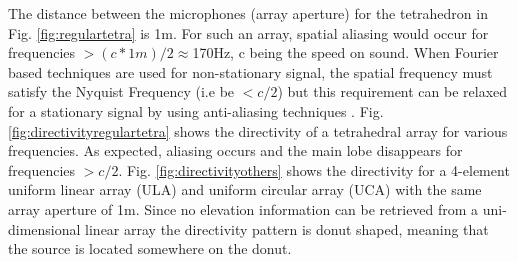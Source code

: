The distance between the microphones (array aperture) for the tetrahedron in Fig. \ref{fig:regulartetra} is 1m. For such an array, spatial aliasing would occur for frequencies $> (c*1m)/2 \approx $170Hz, c being the speed on sound.  When Fourier based techniques are used for non-stationary signal, the spatial frequency must satisfy the Nyquist Frequency (i.e be $< c/2$) but this requirement can be relaxed for a stationary signal by using anti-aliasing techniques \cite{dmochowski2009spatial}. Fig. \ref{fig:directivityregulartetra} shows the directivity of a tetrahedral array for various frequencies. As expected, aliasing occurs and the main lobe disappears for frequencies $> c/2$. Fig. \ref{fig:directivityothers} shows the directivity for a 4-element uniform linear array (ULA) and uniform circular array (UCA) with the same array aperture of 1m. Since no elevation information can be retrieved from a uni-dimensional linear array the directivity pattern is donut shaped, meaning that the source is located somewhere on the donut. 


